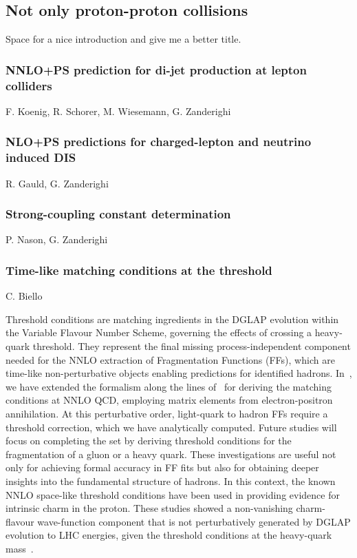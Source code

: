\documentclass{FBR_Bericht_2025}
\begin{document}
\subsection{Not only proton-proton collisions}
\begin{refsection}
Space for a nice introduction and give me a better title.
%
\subsubsection{NNLO+PS prediction for di-jet production at lepton colliders}
\begin{Namen}
F. Koenig, R. Schorer, M. Wiesemann, G. Zanderighi
\end{Namen}
%
\subsubsection{NLO+PS predictions for charged-lepton and neutrino induced DIS}
\begin{Namen}
R. Gauld, G. Zanderighi
\end{Namen}
%
\subsubsection{Strong-coupling constant determination}
\begin{Namen}
P. Nason, G. Zanderighi
\end{Namen}
%
\subsubsection{Time-like matching conditions at the threshold}
\begin{Namen}
C. Biello
\end{Namen}
Threshold conditions are matching ingredients in the DGLAP evolution within the Variable Flavour Number Scheme, governing the effects of crossing a heavy-quark threshold. They represent the final missing process-independent component needed for the NNLO extraction of Fragmentation Functions (FFs), which are time-like non-perturbative objects enabling predictions for identified hadrons. In~, we have extended the formalism along the lines of~ for deriving the matching conditions at NNLO QCD, employing matrix elements from electron-positron annihilation. At this perturbative order, light-quark to hadron FFs require a threshold correction, which we have analytically computed. Future studies will focus on completing the set by deriving threshold conditions for the fragmentation of a gluon or a heavy quark. These investigations are useful not only for achieving formal accuracy in FF fits but also for obtaining deeper insights into the fundamental structure of hadrons. In this context, the known NNLO space-like threshold conditions have been used in providing evidence for intrinsic charm in the proton. These studies showed a non-vanishing charm-flavour wave-function component that is not perturbatively generated by DGLAP evolution to LHC energies, given the threshold conditions at the heavy-quark mass~\cite{Ball:2022qks}.
%

\end{refsection}
\end{document}
